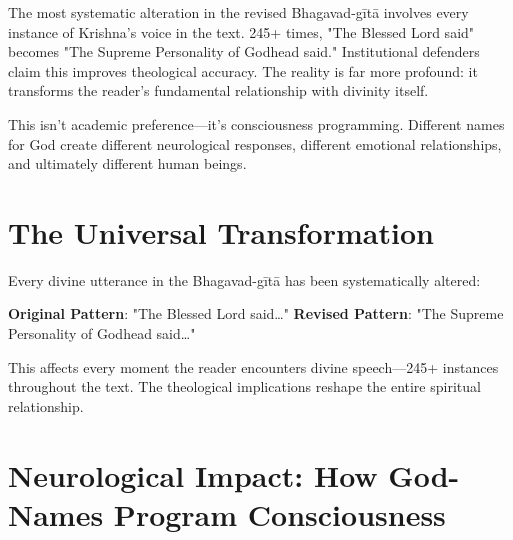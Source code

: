 \documentclass[11pt,twoside]{book}
\begin{document}
\normalfont\justifying
The most systematic alteration in the revised Bhagavad-gītā involves every instance of Krishna's voice in the text. 245+ times, "The Blessed Lord said" becomes "The Supreme Personality of Godhead said." Institutional defenders claim this improves theological accuracy. The reality is far more profound: it transforms the reader's fundamental relationship with divinity itself.

This isn't academic preference—it's consciousness programming. Different names for God create different neurological responses, different emotional relationships, and ultimately different human beings.
\section*{The Universal Transformation}
\label{sec:orgf5a66de}

Every divine utterance in the Bhagavad-gītā has been systematically altered:

\textbf{\textbf{Original Pattern}}: "The Blessed Lord said\ldots{}" 
\textbf{\textbf{Revised Pattern}}: "The Supreme Personality of Godhead said\ldots{}"

This affects every moment the reader encounters divine speech—245+ instances throughout the text. The theological implications reshape the entire spiritual relationship.
\section*{Neurological Impact: How God-Names Program Consciousness}
\label{sec:org85308bc}
\end{document}
